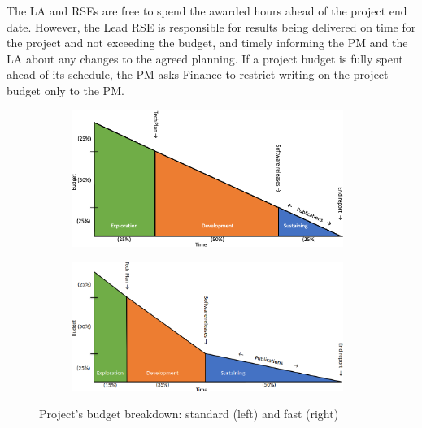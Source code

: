The LA and RSEs are free to spend the awarded hours ahead of the project end date. However, the Lead RSE is responsible 
for results being delivered on time for the project and not exceeding the budget, and timely informing the PM and the LA 
about any changes to the agreed planning. If a project budget is fully spent ahead of its schedule, the PM asks Finance to restrict writing on the
project budget only to the PM.

\begin{figure}[t!]
    \centering
    \begin{subfigure}[b]{0.49\textwidth}
        \centering
        \includegraphics[width=0.97\textwidth]{img/budget-stages.png}
        \vspace{0.2cm}
    \end{subfigure}%
    \hfill
    \begin{subfigure}[b]{0.49\textwidth}
        \centering
        \includegraphics[width=0.97\textwidth]{img/budget-faster.png}
        \vspace{0.2cm}
    \end{subfigure}
    \caption{Project's budget breakdown: standard (left) and fast (right)}
    \label{fig:project-budget}
\end{figure}

